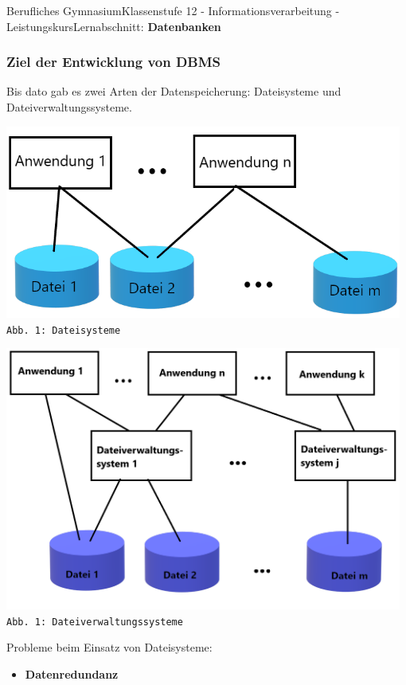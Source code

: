 \documentclass[11pt,oneside,openany,headings=optiontotoc,11pt,numbers=noenddot]{article}
\begin{document}
\begin{worksheet}{Berufliches Gymnasium}{Klassenstufe 12 - Informationsverarbeitung - Leistungskurs}{Lernabschnitt: \textbf{Datenbanken}}
		\subsubsection*{Ziel der Entwicklung von DBMS}
		Bis dato gab es zwei Arten der Datenspeicherung: Dateisysteme und Dateiverwaltungssysteme.\\
		\par\noindent
		\begin{minipage}{0.48\textwidth}
			\includegraphics[width=0.98\textwidth]{../99_Bilder/01_Dateisysteme.png}\\
			\texttt{\footnotesize{Abb. 1: Dateisysteme}}
		\end{minipage}
		\hfill
		\begin{minipage}{0.48\textwidth}
			\includegraphics[width=0.98\textwidth]{../99_Bilder/01_Dateiverwaltungssysteme.png}\\
			\texttt{\footnotesize{Abb. 1: Dateiverwaltungssysteme}}
		\end{minipage}
		\newpage
		Probleme beim Einsatz von Dateisysteme:
		\begin{itemize}[label=-]
			\item \textbf{Datenredundanz}\\

\end{itemize}
\end{worksheet}
\end{document}

